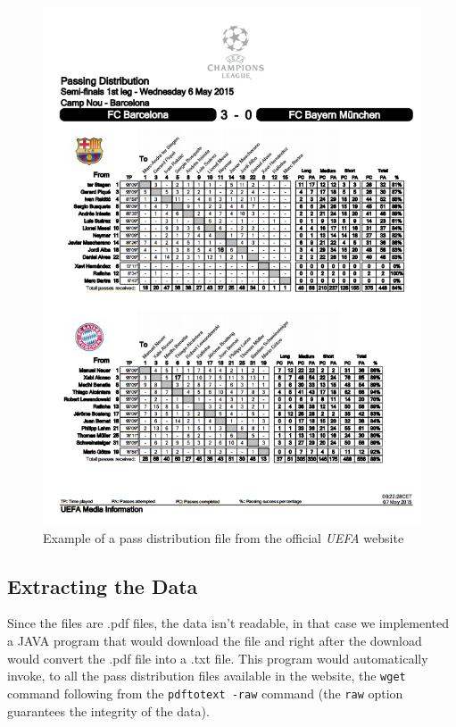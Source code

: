 \documentclass[12pt]{article}
\begin{document}
\begin{figure}[H]
	\centering
	\includegraphics[scale=1]{tpd.png} 
	\caption{Example of a pass distribution file from the official \textit{UEFA} website}
	\label{fig:tpd}
	
\end{figure}

\subsection{Extracting the Data}\label{sec: extract}

Since the files are  .pdf files, the data isn't readable, in that case we implemented a JAVA program that would download the file and right after the download would convert the .pdf file into a .txt file. This program would automatically invoke, to all the pass distribution files available in the website, the \texttt{wget} command following from the \texttt{pdftotext -raw} command (the \texttt{raw} option guarantees the integrity of the data). 
\end{document}
